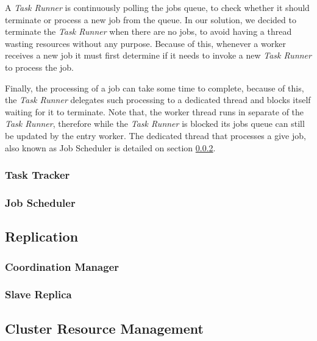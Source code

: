 \documentclass[times, 10pt,twocolumn]{article}
\begin{document}
            A \emph{Task Runner} is continuously polling the jobs queue, to check whether it should terminate or process a new job from the queue. In our solution, we decided to terminate the \emph{Task Runner} when there are no jobs, to avoid having a thread wasting resources without any purpose. Because of this, whenever a worker receives a new job it must first determine if it needs to invoke a new \emph{Task Runner} to process the job.
            
            Finally, the processing of a job can take some time to complete, because of this, the \emph{Task Runner} delegates such processing to a dedicated thread and blocks itself waiting for it to terminate. Note that, the worker thread runs in separate of the \emph{Task Runner}, therefore while the \emph{Task Runner} is blocked its jobs queue can still be updated by the entry worker. The dedicated thread that processes a give job, also known as Job Scheduler is detailed on section \ref{job-scheduler}.

            \subsubsection{Task Tracker}

            
    
        	\subsubsection{Job Scheduler}\label{job-scheduler}
        
        \subsection{Replication}
        
        	\subsubsection{Coordination Manager}
        	
        	\subsubsection{Slave Replica}
    	
    	\subsection{Cluster Resource Management}
    	
\end{document}
